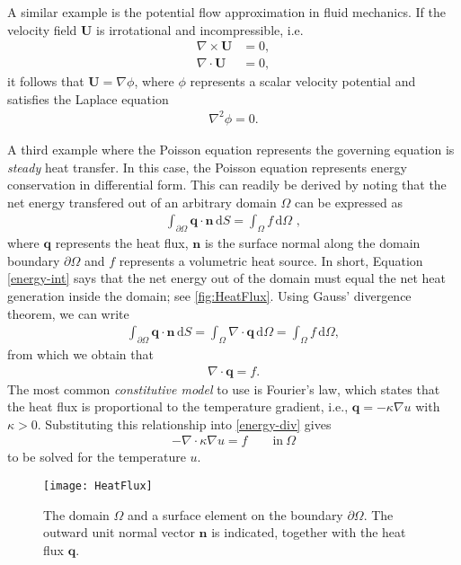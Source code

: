 A similar example is the potential flow approximation in fluid mechanics. If the
velocity field $\bm U$ is irrotational and incompressible, i.e.
\begin{align}
  \nabla \times {\bm U} &= 0, \\
  \nabla \cdot  {\bm U} &= 0,
\end{align}
it follows that ${\bm U}= \nabla \phi$, where $\phi$ represents a scalar
velocity potential and satisfies the Laplace equation
\begin{align}
  \nabla^2 \phi = 0.
\end{align}

A third example where the Poisson equation represents the governing equation is
{\em steady} heat transfer. In this case, the Poisson equation represents energy
conservation in differential form. This can readily be derived by noting that
the net energy transfered out of an arbitrary domain $\Omega$ can be expressed
as
\begin{align}
  \label{energy-int}
  \int_{\partial\Omega} {\bm q}\cdot {\bm n}\, \mathrm{d}S =
  \int_{\Omega}f\, \mathrm{d}\Omega \,\, ,
\end{align}
where $\mathbf{q}$ represents the heat flux, $\mathbf{n}$ is the surface normal
along the domain boundary $\partial\Omega$ and $f$ represents a volumetric heat
source. In short, Equation \eqref{energy-int} says that the net energy out of
the domain must equal the net heat generation inside the domain; see
\autoref{fig:HeatFlux}. Using Gauss' divergence theorem, we can write
\begin{align}
  \int_{\partial\Omega} {\bm q}\cdot {\bm n}\, \mathrm{d}S =
  \int_{\Omega} \nabla \cdot {\bm q}\, \mathrm{d}\Omega = \int_{\Omega}f\,
  \mathrm{d}\Omega,
\end{align}
from which we obtain that
\begin{align}
  \label{energy-div}
  \nabla \cdot {\bm q} = f.
\end{align}
The most common {\em constitutive model} to use is Fourier's law, which states
that the heat flux is proportional to the temperature gradient, i.e., ${\bm q} =
- \kappa \nabla u$ with $\kappa > 0$. Substituting this relationship
into \eqref{energy-div} gives
\begin{align}
  - \nabla\cdot\kappa\nabla u = f \qquad \text{in} \  \Omega
\end{align}
to be solved for the temperature $u$.

\begin{figure}
  \begin{center}
    \texttt{[image: HeatFlux]}
  \end{center}
  \caption{
    The domain $\Omega$ and a surface element on the boundary
    $\partial\Omega$. The outward unit normal vector ${\bm n}$ is indicated,
    together with the heat flux ${\bm q}$.
  }
  \label{fig:HeatFlux}
\end{figure}

